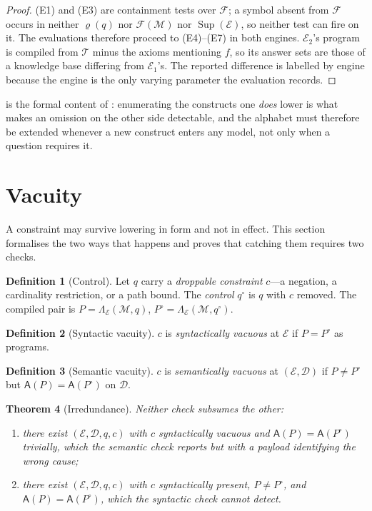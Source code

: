 \documentclass[11pt,a4paper]{article}
\theoremstyle{plain}
\newtheorem{theorem}{Theorem}[section]
\theoremstyle{definition}
\newtheorem{definition}[theorem]{Definition}
\theoremstyle{remark}
\newcommand{\Model}{\mathcal{M}}          %
\newcommand{\Corpus}{\mathcal{D}}         %
\newcommand{\Engine}{\mathcal{E}}         %
\newcommand{\Feat}{\mathcal{F}}           %
\newcommand{\req}{\varrho}                %
\renewcommand{\sup}{\operatorname{Sup}}   %
\newcommand{\Ans}{\mathsf{A}}             %
\newcommand{\lowr}{\Lambda}               %
\newcommand{\qq}{q}
\begin{document}
\begin{proof}
(E1) and (E3) are containment tests over $\Feat$; a symbol absent from $\Feat$
occurs in neither $\req(\qq)$ nor $\Feat(\Model)$ nor $\sup(\Engine)$, so
neither test can fire on it. The evaluations therefore proceed to (E4)--(E7)
in both engines. $\Engine_2$'s program is compiled from $\mathcal{T}$ minus the
axioms mentioning $f$, so its answer sets are those of a knowledge base
differing from $\Engine_1$'s. The reported difference is labelled by engine
because the engine is the only varying parameter the evaluation records.
\end{proof}

 is the formal content of : enumerating
the constructs one \emph{does} lower is what makes an omission on the other
side detectable, and the alphabet must therefore be extended whenever a new
construct enters any model, not only when a question requires it.

\section{Vacuity}
\label{sec:vacuity}

A constraint may survive lowering in form and not in effect. This section
formalises the two ways that happens and proves that catching them requires
two checks.

\begin{definition}[Control]
\label{def:control}
Let $\qq$ carry a \emph{droppable constraint} $c$---a negation, a cardinality
restriction, or a path bound. The \emph{control} $\qq^\circ$ is $\qq$ with $c$
removed. The compiled pair is $P = \lowr_\Engine(\Model,\qq)$,
$P^\circ = \lowr_\Engine(\Model,\qq^\circ)$.
\end{definition}

\begin{definition}[Syntactic vacuity]
\label{def:syn-vacuity}
$c$ is \emph{syntactically vacuous} at $\Engine$ if $P = P^\circ$ as
programs.
\end{definition}

\begin{definition}[Semantic vacuity]
\label{def:sem-vacuity}
$c$ is \emph{semantically vacuous} at $(\Engine,\Corpus)$ if $P \neq P^\circ$
but $\Ans(P) = \Ans(P^\circ)$ on $\Corpus$.
\end{definition}

\begin{theorem}[Irredundance]
\label{thm:irredundance}
Neither check subsumes the other:
\begin{enumerate}[label=(\roman*)]
\item there exist $(\Engine, \Corpus, \qq, c)$ with $c$ syntactically vacuous
      and $\Ans(P) = \Ans(P^\circ)$ trivially, which the semantic check
      reports but with a payload identifying the wrong cause;
\item there exist $(\Engine, \Corpus, \qq, c)$ with $c$ syntactically present,
      $P \neq P^\circ$, and $\Ans(P) = \Ans(P^\circ)$, which the syntactic
      check cannot detect.
\end{enumerate}
\end{theorem}
\end{document}
